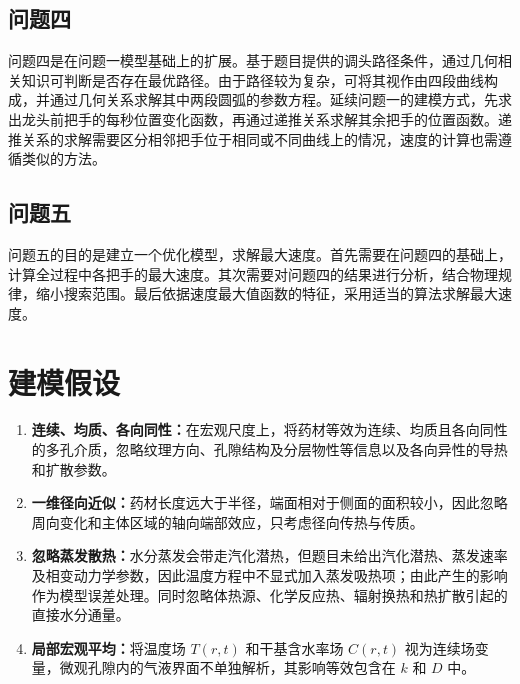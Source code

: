 \documentclass[withoutpreface,bwprint]{cumcmthesis}
\begin{document}
\subsection{问题四}
问题四是在问题一模型基础上的扩展。基于题目提供的调头路径条件，通过几何相关知识可判断是否存在最优路径。由于路径较为复杂，可将其视作由四段曲线构成，并通过几何关系求解其中两段圆弧的参数方程。延续问题一的建模方式，先求出龙头前把手的每秒位置变化函数，再通过递推关系求解其余把手的位置函数。递推关系的求解需要区分相邻把手位于相同或不同曲线上的情况，速度的计算也需遵循类似的方法。

\subsection{问题五}
问题五的目的是建立一个优化模型，求解最大速度。首先需要在问题四的基础上，计算全过程中各把手的最大速度。其次需要对问题四的结果进行分析，结合物理规律，缩小搜索范围。最后依据速度最大值函数的特征，采用适当的算法求解最大速度。

\section{建模假设}
\begin{enumerate}[label=\arabic*.,leftmargin=2em,itemsep=0pt,topsep=0pt]
  \item \textbf{连续、均质、各向同性：}在宏观尺度上，将药材等效为连续、均质且各向同性的多孔介质，忽略纹理方向、孔隙结构及分层物性等信息以及各向异性的导热和扩散参数。
  \item \textbf{一维径向近似：}药材长度远大于半径，端面相对于侧面的面积较小，因此忽略周向变化和主体区域的轴向端部效应，只考虑径向传热与传质。
  \item \textbf{忽略蒸发散热：}水分蒸发会带走汽化潜热，但题目未给出汽化潜热、蒸发速率及相变动力学参数，因此温度方程中不显式加入蒸发吸热项；由此产生的影响作为模型误差处理。同时忽略体热源、化学反应热、辐射换热和热扩散引起的直接水分通量。
  \item \textbf{局部宏观平均：}将温度场 $T(r,t)$ 和干基含水率场 $C(r,t)$ 视为连续场变量，微观孔隙内的气液界面不单独解析，其影响等效包含在 $k$ 和 $D$ 中。

\end{enumerate}
\end{document}
